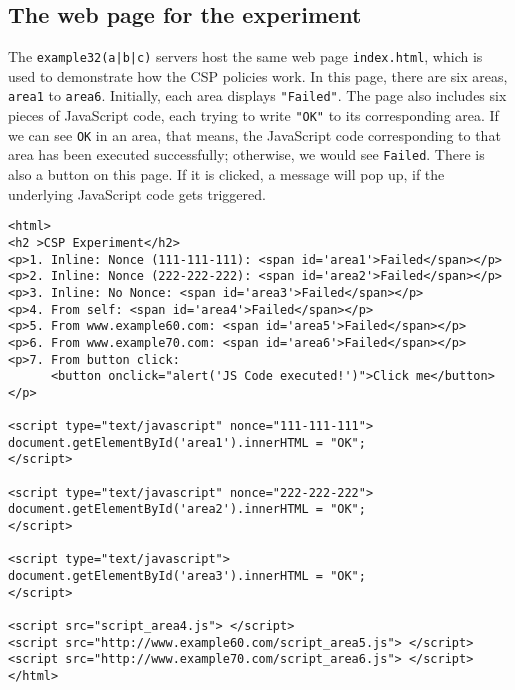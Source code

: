 \subsection{The web page for the experiment}

The \texttt{example32(a|b|c)} servers host 
the same web page \texttt{index.html}, which 
is used to demonstrate how the CSP policies work. 
In this page, there are six areas, \texttt{area1} to \texttt{area6}.
Initially, each area displays \texttt{"Failed"}. The page
also includes six pieces of JavaScript code, each trying to
write \texttt{"OK"} to its corresponding area.  If we can see
\texttt{OK} in an area, that means, the JavaScript code corresponding
to that area has been executed successfully; otherwise, we would see
\texttt{Failed}. There is also a button on this page. 
If it is clicked, a message will pop up, if the underlying 
JavaScript code gets triggered. 


\begin{lstlisting}[caption={The experiment web page \texttt{index.html}}]
<html>
<h2 >CSP Experiment</h2>
<p>1. Inline: Nonce (111-111-111): <span id='area1'>Failed</span></p>
<p>2. Inline: Nonce (222-222-222): <span id='area2'>Failed</span></p>
<p>3. Inline: No Nonce: <span id='area3'>Failed</span></p>
<p>4. From self: <span id='area4'>Failed</span></p>
<p>5. From www.example60.com: <span id='area5'>Failed</span></p>
<p>6. From www.example70.com: <span id='area6'>Failed</span></p>
<p>7. From button click: 
      <button onclick="alert('JS Code executed!')">Click me</button></p>

<script type="text/javascript" nonce="111-111-111">
document.getElementById('area1').innerHTML = "OK";
</script>

<script type="text/javascript" nonce="222-222-222">
document.getElementById('area2').innerHTML = "OK";
</script>

<script type="text/javascript">
document.getElementById('area3').innerHTML = "OK";
</script>

<script src="script_area4.js"> </script>
<script src="http://www.example60.com/script_area5.js"> </script>
<script src="http://www.example70.com/script_area6.js"> </script>
</html>

\end{lstlisting}
 


